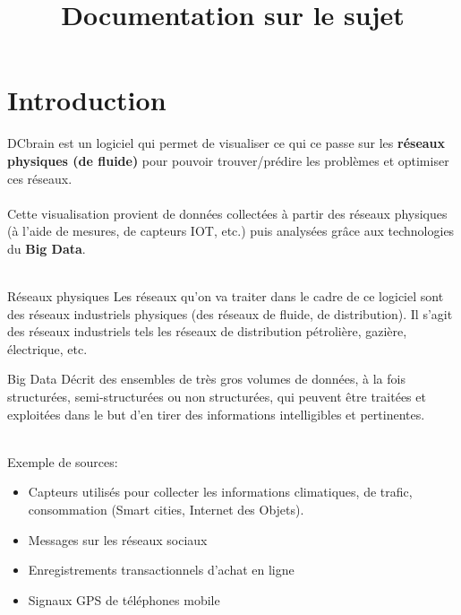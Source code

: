 
\usepackage{../tex/myInfolines}
\title{Documentation sur le sujet}



	\begin{frame}
		\titlepage
	\end{frame}
	
	\section{Introduction}
	\begin{frame}
		DCbrain est un logiciel qui permet de visualiser ce qui ce passe sur les \textbf{réseaux physiques (de fluide)} pour pouvoir trouver/prédire les problèmes et optimiser ces réseaux.\\~\\
		\pause
		Cette visualisation provient de données collectées à partir des réseaux physiques (à l'aide de mesures, de capteurs IOT, etc.) puis analysées grâce aux technologies du \textbf{Big Data}.\\~\\
		\pause
		\begin{block}{Réseaux physiques}
		Les réseaux qu'on va traiter dans le cadre de ce logiciel sont des réseaux industriels physiques (des réseaux de fluide, de distribution). Il s'agit des réseaux industriels tels les réseaux de distribution pétrolière, gazière, électrique, etc.
		\end{block}
	\end{frame}
	
	\begin{frame} 
		\begin{block}{Big Data}
		Décrit des ensembles de très gros volumes de données, à la fois structurées, semi-structurées ou non structurées, qui peuvent être traitées et exploitées dans le but d’en tirer des informations intelligibles et pertinentes.
		\end{block}
		\pause
		~\\
		Exemple de sources: 
		\begin{itemize}
			\pause\item Capteurs utilisés pour collecter les informations climatiques, de trafic, consommation (Smart cities, Internet des Objets).
			\pause\item Messages sur les réseaux sociaux 
			\pause\item Enregistrements transactionnels d’achat en ligne 
			\pause\item Signaux GPS de téléphones mobile
		\end{itemize}
	\end{frame}
	
